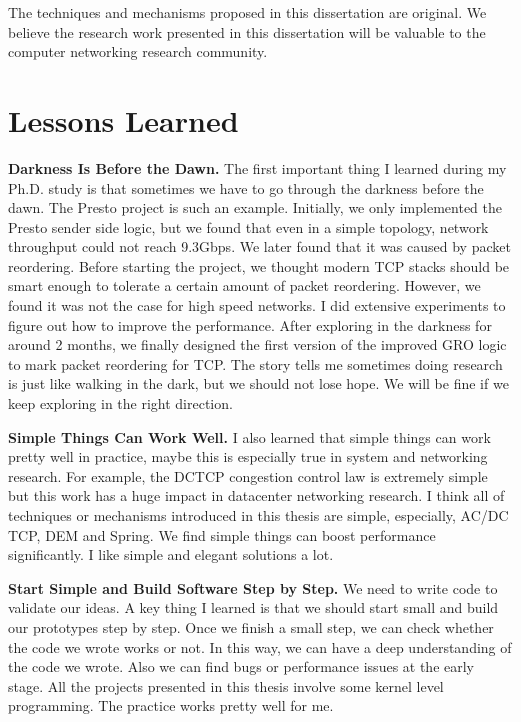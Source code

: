 The techniques and mechanisms proposed in this dissertation are original. 
We believe the research work presented in this dissertation will be valuable to 
the computer networking research community.

\section{Lessons Learned}
{\bf Darkness Is Before the Dawn.}
The first important thing I learned during my Ph.D. study is that sometimes 
we have to go through the darkness before the dawn. The Presto project is such an example. 
Initially, we only implemented the Presto sender side logic, but we found that even in a simple topology, 
network throughput could not reach 9.3Gbps. We later found that it was caused by packet reordering. 
Before starting the project, we thought modern TCP stacks should be smart enough to tolerate 
a certain amount of packet reordering. However, we found it was not the case for high speed networks. 
I did extensive experiments to figure out how to improve the performance. 
After exploring in the darkness for around 2 months, we finally designed the first version of the 
improved GRO logic to mark packet reordering for TCP. 
The story tells me sometimes doing research is just like 
walking in the dark, but we should not lose hope. We will be fine if we keep exploring in the right direction.

{\bf Simple Things Can Work Well.}
I also learned that simple things can work pretty well in practice, maybe this is 
especially true in system and networking research. For example, the DCTCP congestion control law is extremely 
simple but this work has a huge impact in datacenter networking research. I think 
all of techniques or mechanisms introduced in this thesis are simple, especially, AC/DC TCP, DEM and Spring. 
We find simple things can boost performance significantly. I like simple and elegant solutions a lot. 

{\bf Start Simple and Build Software Step by Step.}
We need to write code to validate our ideas. 
A key thing I learned is that we should start small and 
build our prototypes step by step. Once we finish a small step, we can check whether 
the code we wrote works or not. In this way, we can have a deep understanding of the code we wrote. 
Also we can find bugs or performance issues at the early stage. 
All the projects presented in this thesis involve some kernel level programming. 
The practice works pretty well for me.

